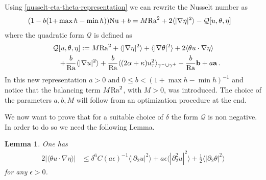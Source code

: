 \documentclass{article}
\newtheorem{lemma}[theorem]{Lemma}
\theoremstyle{definition}
\theoremstyle{definition}
\newcommand{\Ra}{{\rm{Ra}}}
\newcommand{\Nu}{{\rm{Nu}}}
\begin{document}
Using \eqref{nusselt-eta-theta-representation} we can rewrite the Nusselt number as
\begin{align}
    \label{nu-identity-including-Q}
    (1-b(1+&\max h -\min h))\Nu + b 
    = M\Ra^2+2\langle |\nabla\eta|^2\rangle-\mathcal{Q}[u,\theta,\eta]
\end{align}
where the quadratic form $\mathcal{Q}$ is defined as
\begin{multline}\label{quadratic-form}
    \mathcal{Q}[u,\theta,\eta]:=M \Ra^2 + \langle |\nabla \eta|^2\rangle + \langle |\nabla \theta|^2\rangle + 2\langle \theta u\cdot\nabla \eta\rangle 
    \\
    \qquad + \frac{b}{\Ra}\langle |\nabla u|^2\rangle + \frac{b}{\Ra}\langle (2\alpha+\kappa)u_\tau^2\rangle_{\gamma^-\cup\gamma^+} - \frac{b}{\Ra}\mathbf{b} + a \mathbf{a}\,.
\end{multline}
In this new representation $a>0$ and $0\leq b<(1+\max h - \min h)^{-1}$ and notice that the balancing term $M\Ra^2$, with $M>0$, was introduced. The choice of the parameters $a,b,M$ will follow from an optimization procedure at the end.


We now want to prove that for a suitable choice of $\delta$ the form $\mathcal{Q}$ is non negative. In order to do so we need the following Lemma.
\begin{lemma}
\label{lemma-estimate-theta-u-gradeta}
One has
\begin{align*}
    2|\langle\theta u\cdot \nabla \eta\rangle| &\leq  \delta^6 C (a\epsilon)^{-1}\langle |\partial_2 u|^2\rangle + a\epsilon \langle |\partial_2^2 u|^2\rangle +\frac{1}{2}\langle |\partial_2 \theta|^2\rangle
\end{align*}
for any $\epsilon>0$.
\end{lemma}
\end{document}
